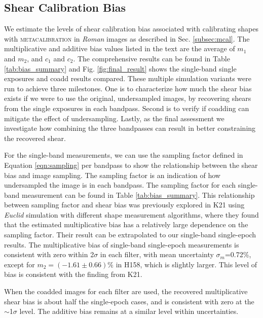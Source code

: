 \documentclass[fleqn,usenatbib]{mnras}
\begin{document}
\subsection{Shear Calibration Bias}
\label{subsec:shapes}
We estimate the levels of shear calibration bias associated with calibrating shapes with \textsc{metacalibration} in \emph{Roman} images as described in Sec. \ref{subsec:mcal}. The multiplicative and additive bias values listed in the text are the average of $m_{1}$ and $m_{2}$, and $c_{1}$ and $c_{2}$. The comprehensive results can be found in Table \ref{tab:bias_summary} and Fig. \ref{fig:final_result} shows the single-band single exposures and coadd results compared. These multiple simulation variants were run to achieve three milestones. One is to characterize how much the shear bias exists if we were to use the original, undersampled images, by recovering shears from the single exposures in each bandpass. Second is to verify if coadding can mitigate the effect of undersampling. Lastly, as the final assessment we investigate how combining the three bandpasses can result in better constraining the recovered shear.


For the single-band measurements, we can use the sampling factor defined in Equation \eqref{eqn:sampling} per bandpass to show the relationship between the shear bias and image sampling. The sampling factor is an indication of how undersampled the image is in each bandpass. The sampling factor for each single-band measurement can be found in Table \ref{tab:bias_summary}. This relationship between sampling factor and shear bias was previously explored in K21 using \emph{Euclid} simulation with different shape measurement algorithms, where they found that the estimated multiplicative bias has a relatively large dependence on the sampling factor. Their result can be extrapolated to our single-band single-epoch results. The multiplicative bias of single-band single-epoch measurements is consistent with zero within 2$\sigma$ in each filter, with mean uncertainty $\sigma_m$=0.72\%, except for $m_{2}=(-1.61\pm0.66)\%$ in H158, which is slightly larger. This level of bias is consistent with the finding from K21. 

When the coadded images for each filter are used, the recovered multiplicative shear bias is about half the single-epoch cases, and is consistent with zero at the $\sim$1$\sigma$ level. The additive bias remains at a similar level within uncertainties. 
\end{document}
